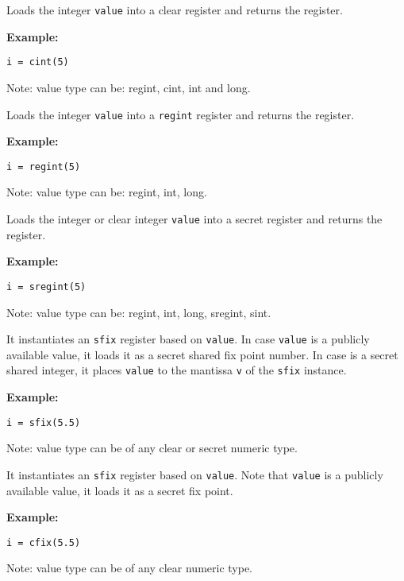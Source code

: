 Loads the integer \verb|value| into a clear register and returns the register.

\noindent
\textbf{Example:}
\begin{lstlisting}
i = cint(5)
\end{lstlisting}
\begin{footnotesize}
Note: value type can be: regint, cint, int and long.
\end{footnotesize}

Loads the integer \verb|value| into a \verb|regint| register and returns 
the register.

\noindent
\textbf{Example:}
\begin{lstlisting}
i = regint(5)
\end{lstlisting}
\begin{footnotesize}
Note: value type can be: regint, int, long.
\end{footnotesize}

Loads the integer or clear integer \verb|value| into a secret register and returns the register.

\noindent
\textbf{Example:}
\begin{lstlisting}
i = sregint(5)
\end{lstlisting}
\begin{footnotesize}
Note: value type can be: regint, int, long, sregint, sint.
\end{footnotesize}

It instantiates  an \verb|sfix| register based on \verb|value|. In case \verb|value| is a publicly available value, it loads it as a secret shared fix point number. In case is a secret shared integer, it places \verb|value| to the mantissa \verb|v| of the \verb|sfix| instance. 

\noindent
\textbf{Example:}
\begin{lstlisting}
i = sfix(5.5)
\end{lstlisting}
\begin{footnotesize}
Note: value type can be of any clear or secret numeric type.
\end{footnotesize}

It instantiates  an \verb|sfix| register based on \verb|value|. 
Note that \verb|value| is a publicly available value, it loads it as a secret fix point. 

\noindent
\textbf{Example:}
\begin{lstlisting}
i = cfix(5.5)
\end{lstlisting}
\begin{footnotesize}
Note: value type can be of any clear numeric type.
\end{footnotesize}


